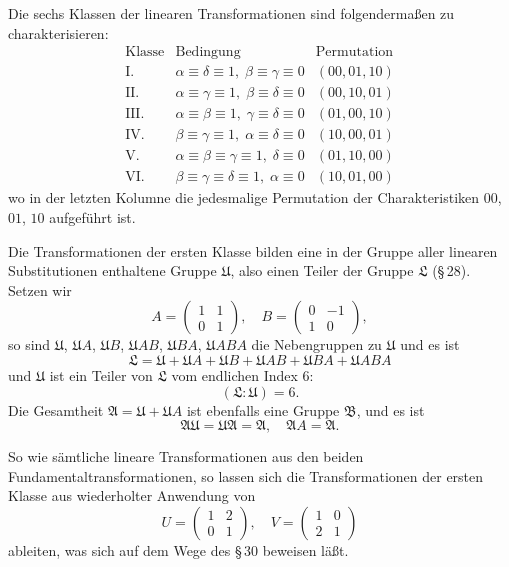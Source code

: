 \documentclass[12pt,a4paper]{article}
\begin{document}
Die sechs Klassen der linearen Transformationen sind folgenderma\ss en zu charakterisieren:
\begin{equation}\label{eq:36_7}
\begin{array}{c|c|c}
\text{Klasse} & \text{Bedingung} & \text{Permutation}\\ \hline
\text{I.} & \alpha\equiv\delta\equiv 1,\; \beta\equiv\gamma\equiv 0 & (00,01,10)\\
\text{II.} & \alpha\equiv\gamma\equiv 1,\; \beta\equiv\delta\equiv 0 & (00,10,01)\\
\text{III.} & \alpha\equiv\beta\equiv 1,\; \gamma\equiv\delta\equiv 0 & (01,00,10)\\
\text{IV.} & \beta\equiv\gamma\equiv 1,\; \alpha\equiv\delta\equiv 0 & (10,00,01)\\
\text{V.} & \alpha\equiv\beta\equiv\gamma\equiv 1,\; \delta\equiv 0 & (01,10,00)\\
\text{VI.} & \beta\equiv\gamma\equiv\delta\equiv 1,\; \alpha\equiv 0 & (10,01,00)
\end{array}
\end{equation}
wo in der letzten Kolumne die jedesmalige Permutation der Charakteristiken $00$, $01$, $10$ aufgef\"uhrt ist.

\newpage
\noindent
Die Transformationen der ersten Klasse bilden eine in der Gruppe aller linearen Substitutionen enthaltene Gruppe $\mathfrak{U}$, also einen Teiler der Gruppe $\mathfrak{L}$ (\S\,28). Setzen wir
\[
A = \begin{pmatrix} 1 & 1 \\ 0 & 1 \end{pmatrix},\quad
B = \begin{pmatrix} 0 & -1 \\ 1 & 0 \end{pmatrix},
\]
so sind $\mathfrak{U}$, $\mathfrak{U}A$, $\mathfrak{U}B$, $\mathfrak{U}AB$, $\mathfrak{U}BA$, $\mathfrak{U}ABA$ die Nebengruppen zu $\mathfrak{U}$ und es ist
\[
\mathfrak{L} = \mathfrak{U} + \mathfrak{U}A + \mathfrak{U}B + \mathfrak{U}AB + \mathfrak{U}BA + \mathfrak{U}ABA
\]
und $\mathfrak{U}$ ist ein Teiler von $\mathfrak{L}$ vom endlichen Index 6:
\[
(\mathfrak{L}:\mathfrak{U}) = 6.
\]
Die Gesamtheit $\mathfrak{A} = \mathfrak{U} + \mathfrak{U}A$ ist ebenfalls eine Gruppe $\mathfrak{B}$, und es ist
\[
\mathfrak{A}\mathfrak{U} = \mathfrak{U}\mathfrak{A} = \mathfrak{A},\quad
\mathfrak{A}A = \mathfrak{A}.
\]

So wie s\"amtliche lineare Transformationen aus den beiden Fundamentaltransformationen, so lassen sich die Transformationen der ersten Klasse aus wiederholter Anwendung von
\[
U = \begin{pmatrix} 1 & 2 \\ 0 & 1 \end{pmatrix},\quad
V = \begin{pmatrix} 1 & 0 \\ 2 & 1 \end{pmatrix}
\]
ableiten, was sich auf dem Wege des \S\,30 beweisen l\"a\ss t.
\end{document}
